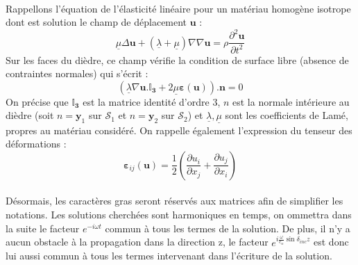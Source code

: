 \paragraph{}
 Rappellons l'équation de l'élasticité linéaire pour un matériau homogène isotrope dont est solution le champ de déplacement $\mathbf{u}$ :
\begin{equation}
\underline{\mu} \Delta \mathbf{u} + (\underline{\lambda}+\underline{\mu})\nabla \nabla \mathbf{u} = \rho \frac{\partial^2 \mathbf{u}}{\partial t^2}
\label{Elasticitelin}
\end{equation}
Sur les faces du dièdre, ce champ vérifie la condition de surface libre (absence de contraintes normales) qui s'écrit :
\begin{equation}
(\underline{\lambda} \nabla \mathbf{u} .\mathbf{\mathbb{I}_3}+2\underline{\mu} \mathbf{\varepsilon} (\mathbf{u})).\mathbf{n}=0
\end{equation}
On précise que $\mathbf{\mathbb{I}_3}$ est la matrice identité d'ordre 3, $n$ est la normale intérieure au dièdre (soit $n=\mathbf{y}_1$ sur $\mathcal{S}_1$  et $n=\mathbf{y}_2$ sur $\mathcal{S}_2$) et $\underline{\lambda}, \underline{\mu}$ sont les coefficients de Lamé, propres au matériau considéré. On rappelle également l'expression du tenseur des déformations :
$$ \mathbf{\varepsilon}_{ij}(\mathbf{u})=\frac{1}{2} (\frac{\partial u_i}{\partial x_j}+\frac{\partial u_j}{\partial x_i}) $$
\paragraph{}
 Désormais, les caractères gras seront réservés aux matrices afin de simplifier les notations. Les solutions cherchées sont harmoniques en temps, on ommettra dans la suite le facteur $e^{-i\omega t}$ commun à tous les termes de la solution. De plus, il n'y a aucun obstacle à la propagation dans la direction z, le facteur $e^{i\frac{\omega}{c_{\alpha}}\sin\delta_{inc}z}$ est donc lui aussi commun à tous les termes intervenant  dans l'écriture de la solution. 

